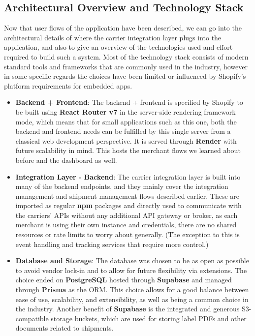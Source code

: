 \documentclass{imc-inf}
\begin{document}
\subsection{Architectural Overview and Technology Stack}
\label{sec:shopickup-architecture-overview}
Now that user flows of the application have been described, we can go into the architectural details of where the carrier integration layer plugs into the application, and also to give an overview of the technologies used and effort required to build such a system.
Most of the technology stack consists of modern standard tools and frameworks that are commonly used in the industry, however in some specific regards the choices have been limited or influenced by Shopify's platform requirements for embedded apps.

\begin{itemize}[itemsep=3pt]
  \item \textbf{Backend + Frontend}: The backend + frontend is specified by Shopify to be built using \textbf{React Router v7} in the server-side rendering framework mode, which means that for small applications such as this one, both the backend and frontend needs can be fulfilled by this single server from a classical web development perspective. It is served through \textbf{Render} with future scalability in mind. This hosts the merchant flows we learned about before and the dashboard as well.
  \item \textbf{Integration Layer - Backend}: The carrier integration layer is built into many of the backend endpoints, and they mainly cover the integration management and shipment management flows described earlier. These are imported as regular \textbf{npm} packages and directly used to communicate with the carriers' APIs without any additional API gateway or broker, as each merchant is using their own instance and credentials, there are no shared resources or rate limits to worry about generally. (The exception to this is event handling and tracking services that require more control.)
  \item \textbf{Database and Storage}: The database was chosen to be as open as possible to avoid vendor lock-in and to allow for future flexibility via extensions. The choice ended on \textbf{PostgreSQL} hosted through \textbf{Supabase} and managed through \textbf{Prisma} as the ORM. This choice allows for a good balance between ease of use, scalability, and extensibility, as well as being a common choice in the industry. Another benefit of \textbf{Supabase} is the integrated and generous S3-compatible storage buckets, which are used for storing label PDFs and other documents related to shipments.

\end{itemize}
\end{document}
